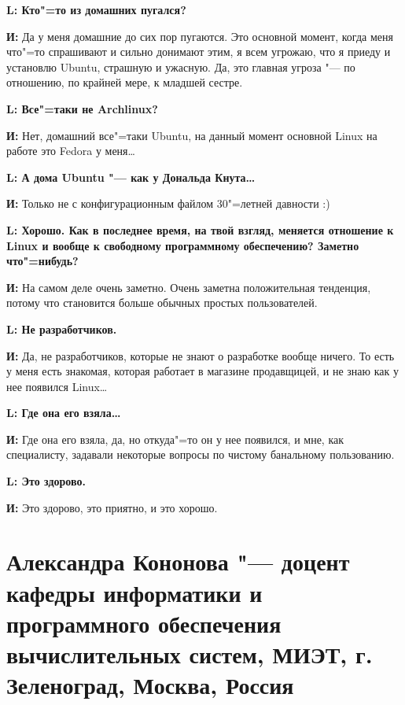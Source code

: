 \documentclass[10pt, a5paper]{article}
\begin{document}
{\noindent \bf L: Кто"=то из домашних пугался?}

{\noindent \bf И:} Да у меня домашние до сих пор пугаются. Это основной момент, когда меня что"=то спрашивают и сильно донимают этим, я всем угрожаю, что я приеду и установлю Ubuntu, страшную и ужасную. Да, это главная угроза "--- по отношению, по крайней мере, к младшей сестре.

{\noindent \bf L: Все"=таки не Archlinux?}

{\noindent \bf И:} Нет, домашний все"=таки Ubuntu, на данный момент основной Linux на работе это Fedora у меня\ldots

{\noindent \bf L: А дома Ubuntu "--- как у Дональда Кнута\ldots}

{\noindent \bf И:} Только не с конфигурационным файлом 30"=летней давности :)

{\noindent \bf L: Хорошо. Как в последнее время, на твой взгляд, меняется отношение к Linux и вообще к свободному программному обеспечению? Заметно что"=нибудь?}

{\noindent \bf И:} На самом деле очень заметно. Очень заметна положительная тенденция, потому что становится больше обычных простых пользователей.

{\noindent \bf L: Не разработчиков.}

{\noindent \bf И:} Да, не разработчиков, которые не знают о разработке вообще ничего. То есть у меня есть знакомая, которая работает в магазине продавщицей, и не знаю как у нее появился Linux\ldots

{\noindent \bf L: Где она его взяла\ldots}

{\noindent \bf И:} Где она его взяла, да, но откуда"=то он у нее появился, и мне, как специалисту, задавали некоторые вопросы по чистому банальному пользованию.

{\noindent \bf L: Это здорово.}

{\noindent \bf И:} Это здорово, это приятно, и это хорошо.

\section{Александра Кононова "--- доцент кафедры информатики и программного обеспечения вычислительных систем, \mbox{МИЭТ}, г. Зеленоград, Москва, Россия}

\end{document}
